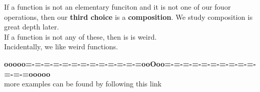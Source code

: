 \documentclass{ximera}
\begin{document}
If a function is not an elementary funciton and it is not one of our fouor operations, then our \textbf{third choice} is a \textbf{\textcolor{purple!85!blue}{composition}}.  We study composition is great depth later. \\


If a function is not any of these, then is is weird.\\

Incidentally, we like weird functions.














\begin{center}
\textbf{\textcolor{green!50!black}{ooooo=-=-=-=-=-=-=-=-=-=-=-=-=ooOoo=-=-=-=-=-=-=-=-=-=-=-=-=ooooo}} \\

more examples can be found by following this link\\ 

\end{center}
\end{document}
